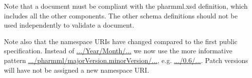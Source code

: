 Note that a \pharmml document must be compliant with the pharmml.xsd
definition, which includes all the other components. The other schema
definitions should not be used independently to validate a \pharmml
document.

Note also that the namespace URIs have changed compared to the first public specification.
Instead of \url{.../Year/Month/...} we now use the more informative pattern 
\url{.../pharmml/majorVersion.minorVersion/...}, e.g. \url{.../0.6/...}. Patch versions will have 
not be assigned a new namespace URI.


